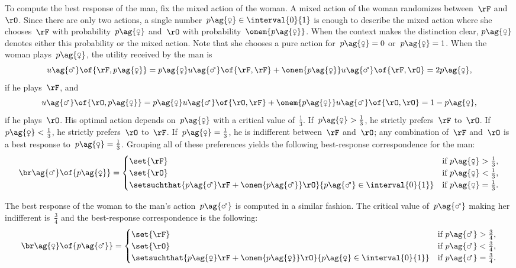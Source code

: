 To compute the best response of the man, fix the mixed action of the woman.
A mixed action of the woman randomizes between~\(\rF\) and~\(\rO\).
Since there are only two actions, a single number~\(p\ag{\female} \in \interval{0}{1}\) is enough to describe the mixed action where she chooses~\(\rF\) with probability~\(p\ag{\female}\) and~\(\rO\) with probability~\(\onem{p\ag{\female}}\).
When the context makes the distinction clear, \(p\ag{\female}\) denotes either this probability or the mixed action.
Note that she chooses a pure action for~\(p\ag{\female}=0\) or~\(p\ag{\female}=1\).
When the woman plays~\(p\ag{\female}\), the utility received by the man is
\begin{equation*}
u\ag{\male} \of {\rF, p\ag{\female}}
=
p\ag{\female} u\ag{\male} \of {\rF, \rF} + \onem{p\ag{\female}} u\ag{\male} \of {\rF, \rO}
=
2p\ag{\female}
,
\end{equation*}
if he plays~\(\rF\), and
\begin{equation*}
u\ag{\male} \of {\rO, p\ag{\female}}
=
p\ag{\female} u\ag{\male} \of {\rO, \rF} + \onem{p\ag{\female}} u\ag{\male} \of {\rO, \rO}
=
1 - p\ag{\female}
,
\end{equation*}
if he plays~\(\rO\).
His optimal action depends on~\(p\ag{\female}\) with a critical value of~\(\frac{1}{3}\).
If~\(p\ag{\female} > \frac{1}{3}\), he strictly prefers~\(\rF\) to~\(\rO\).
If~\(p\ag{\female} < \frac{1}{3}\), he strictly prefers~\(\rO\) to~\(\rF\).
If~\(p\ag{\female} = \frac{1}{3}\), he is indifferent between~\(\rF\) and~\(\rO\); any combination of~\(\rF\) and~\(\rO\) is a best response to~\(p\ag{\female} = \frac{1}{3}\).
Grouping all of these preferences yields the following best-response correspondence for the man:
\begin{equation*}
\br\ag{\male} \of{p\ag{\female}} =
\begin{cases}
\set{\rF} & \text{if } p\ag{\female} > \frac{1}{3}, \\
\set{\rO} & \text{if } p\ag{\female} < \frac{1}{3}, \\
\setsuchthat{p\ag{\male} \rF + \onem{p\ag{\male}} \rO}{p\ag{\male} \in \interval{0}{1}} & \text{if } p\ag{\female} = \frac{1}{3}.
\end{cases}
\end{equation*}

The best response of the woman to the man's action~\(p\ag{\male}\) is computed in a similar fashion.
The critical value of~\(p\ag{\male}\) making her indifferent is~\(\frac{3}{4}\) and the best-response correspondence is the following:
\begin{equation*}
\br\ag{\female} \of{p\ag{\male}} =
\begin{cases}
\set{\rF} & \text{if } p\ag{\male} > \frac{3}{4}, \\
\set{\rO} & \text{if } p\ag{\male} < \frac{3}{4}, \\
\setsuchthat{p\ag{\female} \rF + \onem{p\ag{\female}} \rO}{p\ag{\female} \in \interval{0}{1}} & \text{if } p\ag{\male} = \frac{3}{4}.
\end{cases}
\end{equation*}

